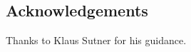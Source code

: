 \documentclass[a0]{a0poster}
\theoremstyle{pleasant}
\newcommand{\0}{\underline{0}}
\newcommand{\1}{\underline{1}}
\newcommand{\2}{\underline{2}}
\begin{document}
\begin{multicols}{3}
\section*{Acknowledgements}

Thanks to Klaus Sutner for his guidance.


\end{multicols}
\end{document}
